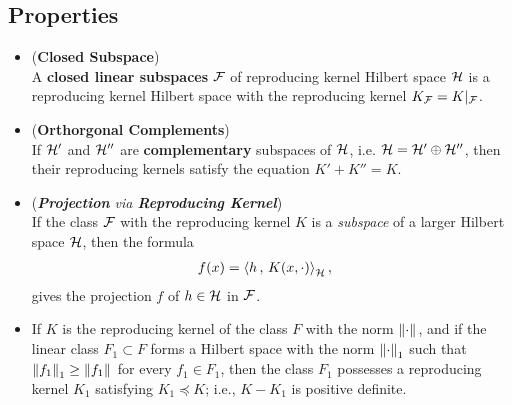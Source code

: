 \documentclass[11pt]{article}
\begin{document}
\subsection{Properties}
\begin{itemize}
\item \begin{proposition} (\textbf{Closed Subspace})\\
A \textbf{closed linear subspaces} ${\mathcal F}$ of reproducing kernel Hilbert space ${\mathcal H}$ is a reproducing kernel Hilbert space with the reproducing kernel $K_{{\mathcal F}} = K|_{{\mathcal F}}$.
\end{proposition}

\item \begin{proposition}  (\textbf{Orthorgonal Complements})\\
If ${\mathcal H}'$ and ${\mathcal H}''$ are \textbf{complementary} subspaces of ${\mathcal H}$, i.e. ${\mathcal H} = {\mathcal H}' \oplus {\mathcal H}''$, then their reproducing kernels satisfy the equation $K'+ K'' = K$.
\end{proposition}

\item \begin{remark} (\emph{\textbf{Projection} via \textbf{Reproducing Kernel}})\\
 If the class ${\mathcal F}$ with the reproducing kernel $K$ is a \emph{subspace} of a larger Hilbert space ${\mathcal H}$, then the formula 
\begin{align*}
f(x) &=\left\langle h\,,\, K(x, \cdot) \right\rangle_{{\mathcal H}},
\end{align*} 
gives the projection $f$ of $h \in {\mathcal H}$ in ${\mathcal F}$.
\end{remark}

\item 
\begin{proposition}
If $K$ is the reproducing kernel of the class $F$ with the norm $\left\|\cdot\right\|_{}$, and if the linear class $F_{1}\subset F$ forms a Hilbert space with the norm $\left\|\cdot\right\|_{1}$ such that $\left\|f_{1}\right\|_{1} \ge \left\|f_{1}\right\|_{}$ for every $f_{1} \in F_{1}$, then the class $F_{1}$ possesses a reproducing kernel $K_{1}$ satisfying $K_{1} \preceq K$; i.e., $K-K_{1}$ is positive definite.
\end{proposition}




\end{itemize}
\end{document}
